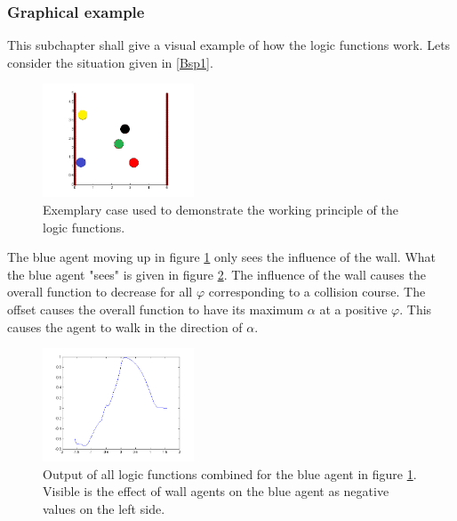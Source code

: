 \subsubsection{Graphical example}
This subchapter shall give a visual example of how the logic functions work. Lets consider the situation given in \ref{Bsp1}.
\begin{figure}[h!]
	\centering
		\includegraphics[width=0.40\textwidth]{pictures/Bsp1}
	\caption{Exemplary case used to demonstrate the working principle of the logic functions.}
	\label{fig:Bsp1}
\end{figure}

\noi The blue agent moving up in figure \ref{fig:Bsp1} only sees the influence of the wall. What the blue agent "sees" is given in figure \ref{fig:Bsp1LinksUnten}. The influence of the wall causes the overall function to decrease for all $\varphi$ corresponding to a collision course. The offset causes the overall function to have its maximum $\alpha$ at a positive $\varphi$. This causes the agent to walk in the direction of $\alpha$.\\
\begin{figure}[h!]
	\centering
		\includegraphics[width=0.40\textwidth]{pictures/Bsp1LinksUnten}
	\caption{Output of all logic functions combined for the blue agent in figure \ref{fig:Bsp1}. Visible is the effect of wall agents on the blue agent as negative values on the left side.}
	\label{fig:Bsp1LinksUnten}
\end{figure}


